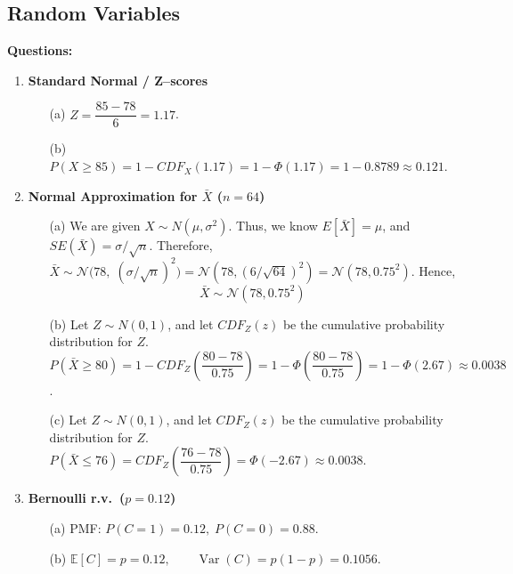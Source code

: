 \documentclass{article}
\begin{document}
\subsection{Random Variables}

\textbf{Questions:}

\begin{enumerate}
\item \textbf{Standard Normal / Z–scores}  
      \begin{enumerate}
        \item[(a)] \(Z=\dfrac{85-78}{6}=1.17\).
        \item[(b)] \(P(X\ge 85)=1-CDF_X(1.17)=1-\Phi(1.17)=1-0.8789\approx 0.121\).
      \end{enumerate}

\item \textbf{Normal Approximation for \(\bar X\) (\(n=64\))}  
      \begin{enumerate}
        \item[(a)] We are given $X\sim N(\mu, \sigma^2)$. Thus, we know $E[\bar X ] = \mu$, and $SE(\bar X )= \sigma / \sqrt{n}$. \newline Therefore, \(\bar X\sim\mathcal N\!\bigl(78,\;(\sigma/\sqrt n)^2\bigr)=\mathcal N(78,(6/\sqrt{64})^2)=\mathcal N(78,0.75^2)\). Hence,
        $$\bar X \sim \mathcal N(78,0.75^2) $$
        \item[(b)] Let $Z \sim N(0,1)$, and let $CDF_Z(z)$ be the cumulative probability distribution for $Z$. \(P(\bar X\ge 80)
                    = 1 - CDF_Z\left(\dfrac{80-78}{0.75}\right)
                    = 1-\Phi\!\left(\dfrac{80-78}{0.75}\right)
                    = 1-\Phi(2.67)\approx 0.0038\).
        \item[(c)] Let $Z \sim N(0,1)$, and let $CDF_Z(z)$ be the cumulative probability distribution for $Z$. \(P(\bar X\le 76)=CDF_Z\left(\dfrac{76-78}{0.75}\right)=\Phi(-2.67)\approx 0.0038\).
      \end{enumerate}

\item \textbf{Bernoulli r.v.\ (\(p=0.12\))}  
      \begin{enumerate}
        \item[(a)] PMF:\; \(P(C=1)=0.12,\;P(C=0)=0.88\).
        \item[(b)] \(\mathbb E[C]=p=0.12,\qquad\operatorname{Var}(C)=p(1-p)=0.1056\).
      \end{enumerate}


\end{enumerate}
\end{document}
